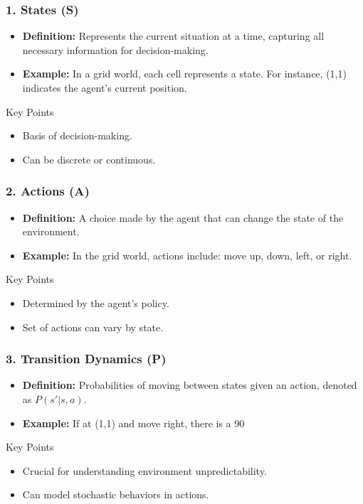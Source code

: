 \documentclass[aspectratio=169]{beamer}
\begin{document}
\begin{frame}[fragile]
    \frametitle{1. States (S)}
    \begin{itemize}
        \item \textbf{Definition:} Represents the current situation at a time, capturing all necessary information for decision-making.
        \item \textbf{Example:} In a grid world, each cell represents a state. For instance, (1,1) indicates the agent's current position.
    \end{itemize}
    
    \begin{block}{Key Points}
        \begin{itemize}
            \item Basis of decision-making.
            \item Can be discrete or continuous.
        \end{itemize}
    \end{block}
\end{frame}

\begin{frame}[fragile]
    \frametitle{2. Actions (A)}
    \begin{itemize}
        \item \textbf{Definition:} A choice made by the agent that can change the state of the environment.
        \item \textbf{Example:} In the grid world, actions include: move up, down, left, or right.
    \end{itemize}
    
    \begin{block}{Key Points}
        \begin{itemize}
            \item Determined by the agent's policy.
            \item Set of actions can vary by state.
        \end{itemize}
    \end{block}
\end{frame}

\begin{frame}[fragile]
    \frametitle{3. Transition Dynamics (P)}
    \begin{itemize}
        \item \textbf{Definition:} Probabilities of moving between states given an action, denoted as \( P(s' | s, a) \).
        \item \textbf{Example:} If at (1,1) and move right, there is a 90%
    \end{itemize}

    \begin{block}{Key Points}
        \begin{itemize}
            \item Crucial for understanding environment unpredictability.
            \item Can model stochastic behaviors in actions.
        \end{itemize}
    \end{block}
\end{frame}
\end{document}
